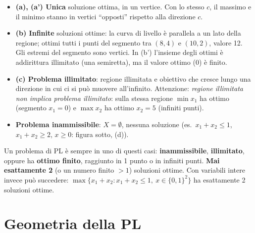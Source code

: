 \begin{center}
\end{center}
\begin{itemize}[nosep]
\item \textbf{(a), (a') Unica} soluzione ottima, in un vertice. Con lo stesso $c$, il massimo e il minimo stanno in vertici ``opposti'' rispetto alla direzione $c$.
\item \textbf{(b) Infinite} soluzioni ottime: la curva di livello è parallela a un lato della regione; ottimi tutti i punti del segmento tra $(8,4)$ e $(10,2)$, valore 12. Gli estremi del segmento sono vertici. In (b') l'insieme degli ottimi è addirittura illimitato (una semiretta), ma il valore ottimo ($0$) è finito.
\item \textbf{(c) Problema illimitato}: regione illimitata e obiettivo che cresce lungo una direzione in cui ci si può muovere all'infinito. Attenzione: \emph{regione illimitata non implica problema illimitato}: sulla stessa regione $\min x_1$ ha ottimo (segmento $x_1=0$) e $\max x_2$ ha ottimo $x_2=5$ (infiniti punti).
\item \textbf{Problema inammissibile}: $X=\emptyset$, nessuna soluzione (es.\ $x_1+x_2\le1$, $x_1+x_2\ge2$, $x\ge0$: figura sotto, (d)).
\end{itemize}
\begin{esame}
Un problema di PL è sempre in uno di questi casi: \textbf{inammissibile}, \textbf{illimitato}, oppure ha \textbf{ottimo finito}, raggiunto in 1 punto o in infiniti punti. \textbf{Mai esattamente 2} (o un numero finito $>1$) soluzioni ottime. Con variabili intere invece può succedere: $\max\{x_1+x_2: x_1+x_2\le1,\ x\in\{0,1\}^2\}$ ha esattamente 2 soluzioni ottime.
\end{esame}

\section{Geometria della PL}

